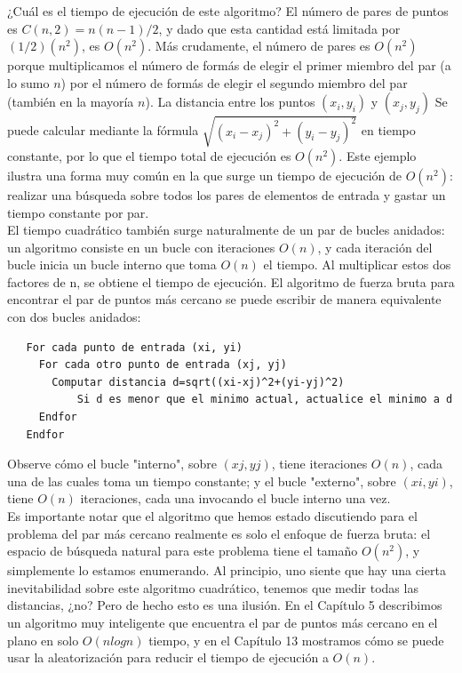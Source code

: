 \documentclass[a4paper, 12pt]{book}
\begin{document}
¿Cuál es el tiempo de ejecución de este algoritmo? El número de pares de puntos es $C(n,2)=n(n-1)/2$, y dado que esta cantidad está limitada por $(1/2)(n^2)$, es $O(n^2)$. Más crudamente, el número de pares es $O(n^2)$ porque multiplicamos el número de formás de elegir el primer miembro del par (a lo sumo $n$) por el número de formás de elegir el segundo miembro del par (también en la mayoría $n$). La distancia entre los puntos \((x_{i},y_{i})\) y \((x_{j},y_{j})\) Se puede calcular mediante la fórmula
\(\sqrt{(x_{i}-x_{j})^2+(y_{i}-y_{j})^2}\) en tiempo constante, por lo que el tiempo total de ejecución es $O(n^2)$. Este ejemplo ilustra una forma muy común en la que surge un tiempo de ejecución de $O(n^2)$: realizar una búsqueda sobre todos los pares de elementos de entrada y gastar un tiempo constante por par.\\

El tiempo cuadrático también surge naturalmente de un par de bucles anidados: un algoritmo consiste en un bucle con iteraciones $O(n)$, y cada iteración del bucle inicia un bucle interno que toma $O(n)$ el tiempo. Al multiplicar estos dos factores de n, se obtiene el tiempo de ejecución. 
El algoritmo de fuerza bruta para encontrar el par de puntos más cercano se puede escribir de manera equivalente con dos bucles anidados:\\


\begin{lstlisting}
   For cada punto de entrada (xi, yi)
     For cada otro punto de entrada (xj, yj)
       Computar distancia d=sqrt((xi-xj)^2+(yi-yj)^2)
           Si d es menor que el minimo actual, actualice el minimo a d
     Endfor
   Endfor
\end{lstlisting}

Observe cómo el bucle "interno", sobre $(xj,yj)$, tiene iteraciones $O(n)$, cada una de las cuales toma un tiempo constante; y el bucle "externo", sobre $(xi,yi)$, tiene $O(n)$ iteraciones, cada una invocando el bucle interno una vez.\\

Es importante notar que el algoritmo que hemos estado discutiendo para el problema del par más cercano realmente es solo el enfoque de fuerza bruta: el espacio de búsqueda natural para este problema tiene el tamaño $O(n^2)$, y simplemente lo estamos enumerando. Al principio, uno siente que hay una cierta inevitabilidad sobre este algoritmo cuadrático, tenemos que medir todas las distancias, ¿no? Pero de hecho esto es una ilusión. En el Capítulo 5 describimos un algoritmo muy inteligente que encuentra el par de puntos más cercano en el plano en solo $O(nlogn)$ tiempo, y en el Capítulo 13 mostramos cómo se puede usar la aleatorización para reducir el tiempo de ejecución a $O(n)$.\\
\end{document}
